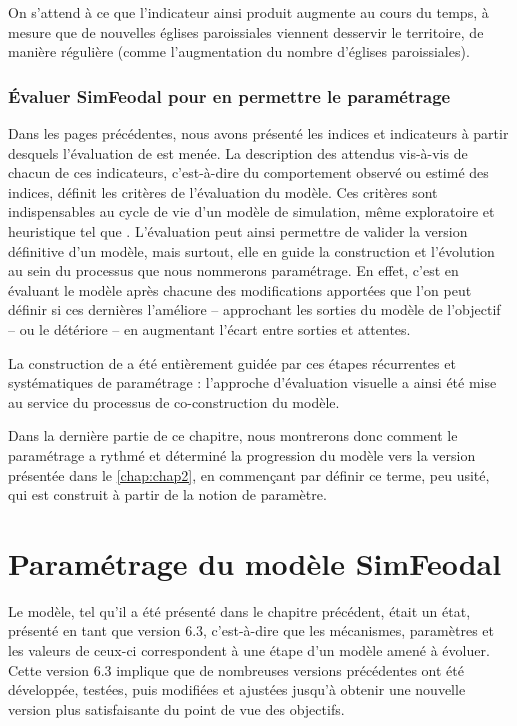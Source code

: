 On s'attend à ce que l'indicateur ainsi produit augmente au cours du temps, à mesure que de nouvelles églises paroissiales viennent desservir le territoire, de manière régulière (comme l'augmentation du nombre d'églises paroissiales).

\subsubsection{Évaluer SimFeodal pour en permettre le paramétrage}

Dans les pages précédentes, nous avons présenté les indices et indicateurs à partir desquels l'évaluation de \simfeodal{} est menée.
La description des attendus vis-à-vis de chacun de ces indicateurs, c'est-à-dire du comportement observé ou estimé des indices, définit les critères de l'évaluation du modèle.
Ces critères sont indispensables au cycle de vie d'un modèle de simulation, même exploratoire et heuristique tel que \simfeodal{}.
L'évaluation peut ainsi permettre de \og valider\fg{} la version définitive d'un modèle, mais surtout, elle en guide la construction et l'évolution au sein du processus que nous nommerons paramétrage.
En effet, c'est en évaluant le modèle après chacune des modifications apportées que l'on peut définir si ces dernières l'améliore -- approchant les sorties du modèle de l'objectif -- ou le détériore -- en augmentant l'écart entre sorties et attentes.

La construction de \simfeodal{} a été entièrement guidée par ces étapes récurrentes et systématiques de paramétrage : l'approche d'évaluation visuelle a ainsi été mise au service du processus de co-construction du modèle.

Dans la dernière partie de ce chapitre, nous montrerons donc comment le paramétrage a rythmé et déterminé la progression du modèle vers la version présentée dans le \cref{chap:chap2}, en commençant par définir ce terme, peu usité, qui est construit à partir de la notion de paramètre.

\section{Paramétrage du modèle SimFeodal}


Le modèle, tel qu'il a été présenté dans le chapitre précédent, était un \og état\fg{}, présenté en tant que \og version 6.3\fg{}, c'est-à-dire que les mécanismes, paramètres et les valeurs de ceux-ci correspondent à une étape d'un modèle amené à évoluer.
Cette version 6.3 implique que de nombreuses versions précédentes ont été développée, testées, puis modifiées et ajustées jusqu'à obtenir une nouvelle version plus satisfaisante du point de vue des objectifs.

